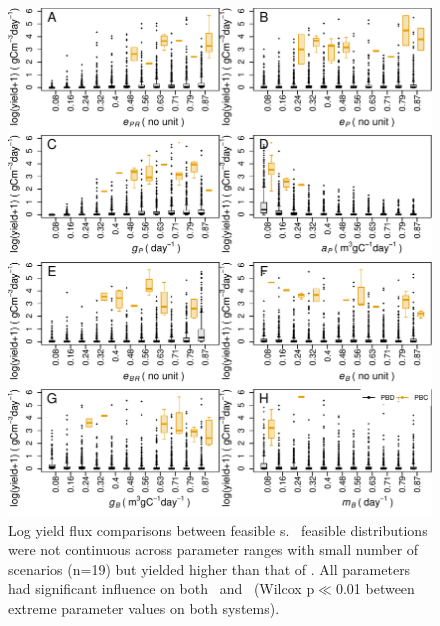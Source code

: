 \documentclass[../thesis.tex]{subfiles} %
\begin{document}
\begin{figure}[H]
    \centering
    \includegraphics[width=\linewidth]{result/harvB.pdf}
    \caption[Log yield flux comparisons between feasible \pbs s]{Log yield flux comparisons between feasible \pbs s.  \PBH\ feasible distributions were not continuous across parameter ranges with small number of scenarios (n=19) but yielded higher than that of \PBN.  All parameters had significant influence on both \PBN\ and \PBH\ (Wilcox p$\ll$0.01 between extreme parameter values on both systems).\lnExplain}
    \label{f:harvPB}
\end{figure}
\end{document}
